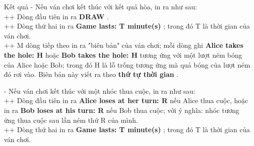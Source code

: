 Kết quả  
- Nếu ván chơi kết thúc với kết quả hòa, in ra như sau:   
\\   ++ Dòng đầu tiên in ra   \textbf{    DRAW   }   .   
\\   ++ Dòng thứ hai in ra   \textbf{    Game lasts: T minute(s)   }   ; trong đó T là thời gian của ván chơi.   
\\   ++ M dòng tiếp theo in ra "biên bản" của ván chơi; mỗi dòng ghi   \textbf{    Alice takes the hole: H   }   hoặc   \textbf{    Bob takes the hole: H   }   tương ứng với một lượt ném bóng của Alice hoặc Bob; trong đó H là lỗ trống tương ứng mà quả bóng của lượt ném đó rơi vào. Biên bản này viết ra theo   \textbf{    thứ tự thời gian   }   .  

   - Nếu ván chơi kết thúc với một nhóc thua cuộc, in ra như sau:   
\\   ++ Dòng đầu tiên in ra   \textbf{    Alice loses at her turn: R   }   nếu Alice thua cuộc, hoặc in ra   \textbf{    Bob loses at his turn: R   }   nếu Bob thua cuộc; với ý nghĩa: nhóc tương ứng thua cuộc sau lần ném thứ R của mình.   
\\   ++ Dòng thứ hai in ra   \textbf{    Game lasts: T minute(s)   }   ; trong đó T là thời gian của ván chơi.
